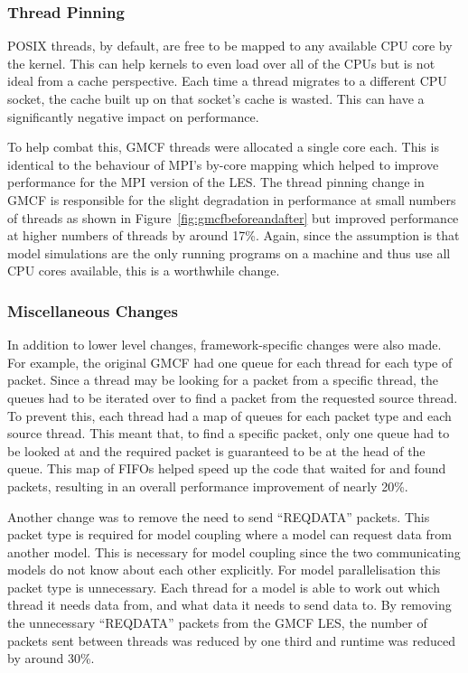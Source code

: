 \subsubsection{Thread Pinning}

POSIX threads, by default, are free to be mapped to any available CPU core by
the kernel. This can help kernels to even load over all of the CPUs but is not
ideal from a cache perspective. Each time a thread migrates to a different CPU
socket, the cache built up on that socket's cache is wasted. This can have a
significantly negative impact on performance.

To help combat this, GMCF threads were allocated a single core each. This is
identical to the behaviour of MPI's by-core mapping which helped to improve
performance for the MPI version of the LES. The thread pinning change in GMCF is
responsible for the slight degradation in performance at small numbers of
threads as shown in Figure~\ref{fig:gmcfbeforeandafter} but improved performance
at higher numbers of threads by around 17\%. Again, since the assumption is that
model simulations are the only running programs on a machine and thus use all
CPU cores available, this is a worthwhile change.

\subsubsection{Miscellaneous Changes}

In addition to lower level changes, framework-specific changes were also made.
For example, the original GMCF had one queue for each thread for each type of
packet. Since a thread may be looking for a packet from a specific thread, the
queues had to be iterated over to find a packet from the requested source
thread. To prevent this, each thread had a map of queues for each packet type
and each source thread. This meant that, to find a specific packet, only one
queue had to be looked at and the required packet is guaranteed to be at the
head of the queue. This map of FIFOs helped speed up the code that waited for
and found packets, resulting in an overall performance improvement of nearly
20\%.

Another change was to remove the need to send ``REQDATA'' packets. This packet
type is required for model coupling where a model can request data from another
model. This is necessary for model coupling since the two communicating models
do not know about each other explicitly. For model parallelisation this packet
type is unnecessary. Each thread for a model is able to work out which thread it
needs data from, and what data it needs to send data to. By removing the
unnecessary ``REQDATA'' packets from the GMCF LES, the number of packets sent
between threads was reduced by one third and runtime was reduced by around 30\%.

